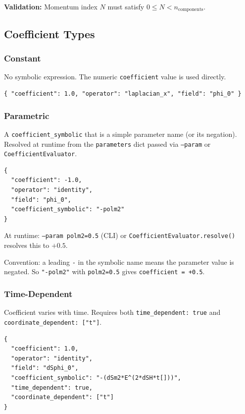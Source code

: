 \textbf{Validation:} Momentum index $N$ must satisfy $0 \leq N < n_\text{components}$.


\subsection{Coefficient Types}
\label{sec:json-coefficient-types}

\subsubsection{Constant}
\label{sec:json-coeff-constant}

No symbolic expression. The numeric \texttt{coefficient} value is used directly.

\begin{lstlisting}[style=json]
{ "coefficient": 1.0, "operator": "laplacian_x", "field": "phi_0" }
\end{lstlisting}

\subsubsection{Parametric}
\label{sec:json-coeff-parametric}

A \texttt{coefficient\_symbolic} that is a simple parameter name (or its negation). Resolved at runtime from the \texttt{parameters} dict passed via \texttt{--param} or \texttt{CoefficientEvaluator}.

\begin{lstlisting}[style=json]
{
  "coefficient": -1.0,
  "operator": "identity",
  "field": "phi_0",
  "coefficient_symbolic": "-polm2"
}
\end{lstlisting}

At runtime: \texttt{--param polm2=0.5} (CLI) or \texttt{CoefficientEvaluator.resolve()} resolves this to $+0.5$.

Convention: a leading \texttt{-} in the symbolic name means the parameter value is negated. So \texttt{"-polm2"} with \texttt{polm2=0.5} gives \texttt{coefficient = +0.5}.

\subsubsection{Time-Dependent}
\label{sec:json-coeff-time-dependent}

Coefficient varies with time. Requires both \texttt{time\_dependent: true} and \texttt{coordinate\_dependent: ["t"]}.

\begin{lstlisting}[style=json]
{
  "coefficient": 1.0,
  "operator": "identity",
  "field": "dSphi_0",
  "coefficient_symbolic": "-(dSm2*E^(2*dSH*t[]))",
  "time_dependent": true,
  "coordinate_dependent": ["t"]
}
\end{lstlisting}

